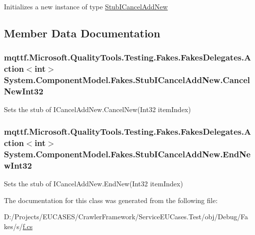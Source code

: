 Initializes a new instance of type \hyperlink{class_system_1_1_component_model_1_1_fakes_1_1_stub_i_cancel_add_new}{Stub\-I\-Cancel\-Add\-New}



\subsection{Member Data Documentation}
\hypertarget{class_system_1_1_component_model_1_1_fakes_1_1_stub_i_cancel_add_new_a505c8a2937dd1b26c2ade40c893fa971}{
\subsubsection[{Cancel\-New\-Int32}]{\setlength{\rightskip}{0pt plus 5cm}mqttf.\-Microsoft.\-Quality\-Tools.\-Testing.\-Fakes.\-Fakes\-Delegates.\-Action$<$int$>$ System.\-Component\-Model.\-Fakes.\-Stub\-I\-Cancel\-Add\-New.\-Cancel\-New\-Int32}}\label{class_system_1_1_component_model_1_1_fakes_1_1_stub_i_cancel_add_new_a505c8a2937dd1b26c2ade40c893fa971}


Sets the stub of I\-Cancel\-Add\-New.\-Cancel\-New(\-Int32 item\-Index)

\hypertarget{class_system_1_1_component_model_1_1_fakes_1_1_stub_i_cancel_add_new_a72eb5ac291d8770539dd2f37a164bd9f}{
\subsubsection[{End\-New\-Int32}]{\setlength{\rightskip}{0pt plus 5cm}mqttf.\-Microsoft.\-Quality\-Tools.\-Testing.\-Fakes.\-Fakes\-Delegates.\-Action$<$int$>$ System.\-Component\-Model.\-Fakes.\-Stub\-I\-Cancel\-Add\-New.\-End\-New\-Int32}}\label{class_system_1_1_component_model_1_1_fakes_1_1_stub_i_cancel_add_new_a72eb5ac291d8770539dd2f37a164bd9f}


Sets the stub of I\-Cancel\-Add\-New.\-End\-New(\-Int32 item\-Index)



The documentation for this class was generated from the following file\-:\begin{DoxyCompactItemize}
\item 
D\-:/\-Projects/\-E\-U\-C\-A\-S\-E\-S/\-Crawler\-Framework/\-Service\-E\-U\-Cases.\-Test/obj/\-Debug/\-Fakes/s/\hyperlink{s_2f_8cs}{f.\-cs}\end{DoxyCompactItemize}
